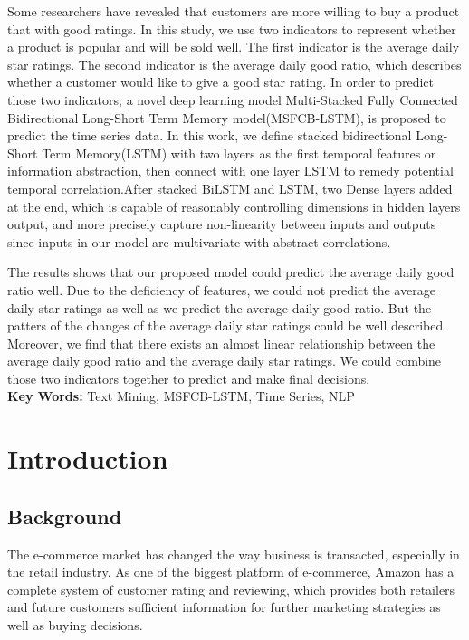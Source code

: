 \documentclass[12pt]{article}
\begin{document}
Some researchers have revealed that customers are more willing to buy a product that with good ratings. In this study, we use two indicators to represent whether a product is popular and will be sold well. The first indicator is the average daily star ratings. The second indicator is the average daily good ratio, which describes whether a customer would like to give a good star rating. In order to predict those two indicators, a novel deep learning model Multi-Stacked Fully Connected Bidirectional Long-Short Term Memory model(MSFCB-LSTM), is proposed to predict the time series data. In this work, we define stacked bidirectional Long-Short Term Memory(LSTM) with two layers as the first temporal features or information abstraction, then connect with one layer LSTM to remedy potential temporal correlation.After stacked BiLSTM and LSTM, two Dense layers added at the end, which is capable of reasonably controlling dimensions in hidden layers output, and more precisely capture non-linearity between inputs and outputs since inputs in our model are multivariate with abstract correlations.

The results shows that our proposed model could predict the average daily good ratio well. Due to the deficiency of features, we could not predict the average daily star ratings as well as we predict the average daily good ratio. But the patters of the changes of the average daily star ratings could be well described. Moreover, we find that there exists an almost linear relationship between the average daily good ratio and the average daily star ratings. We could combine those two indicators together to predict and make final decisions.\\[2ex]
\textbf{Key Words:} Text Mining, MSFCB-LSTM, Time Series, NLP


\clearpage
\pagestyle{fancy}
\newpage
\setcounter{page}{1}

\tableofcontents

\section{Introduction}
\subsection{Background}

The e-commerce market has changed the way business is transacted, especially in the retail industry. As one of the biggest platform of e-commerce, Amazon has a complete system of customer rating and reviewing, which provides both retailers and future customers sufficient information for further marketing strategies as well as buying decisions. 
\end{document}
